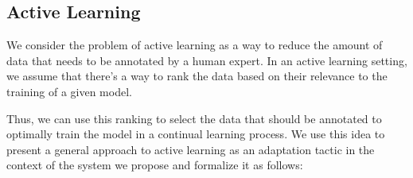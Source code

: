 \documentclass[../main.tex]{subfiles}
\begin{document}
    
        
    

    \subsection{Active Learning}

    We consider the problem of active learning as a way to reduce the amount of data that needs to be annotated by a human expert. In an active learning setting, we assume that there's a way to rank the data based on their relevance to the training of a given model. 
    
    Thus, we can use this ranking to select the data that should be annotated to optimally train the model in a continual learning process. We use this idea to present a general approach to active learning as an adaptation tactic in the context of the system we propose and formalize it as follows:
\end{document}
